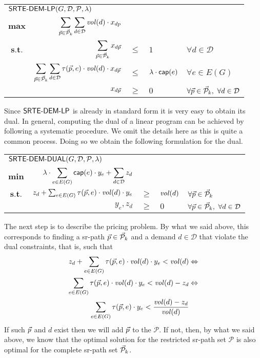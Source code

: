 \begin{center}
\begin{tabular}{crcll}
\multicolumn{5}{l}{$\displaystyle \textsf{SRTE-DEM-LP}(G, \mathcal{D}, \mathcal{P}, \lambda)$} \\[0.5cm] 
$\displaystyle \mathbf{max}$ & $\displaystyle \sum_{\vec{p} \in \mathcal{\vec{P}}_k} \sum_{d \in \mathcal{D}} \mathit{vol}(d) \cdot x_{dp}$ & & & \\[0.5cm]
$\textbf{s.t.}$ & $\displaystyle \sum_{\vec{p} \in \mathcal{\vec{P}}_k} x_{d \vec{p}}$ & $\leq$ & $1$ & $\forall d \in \mathcal{D}$ \\[0.5cm] 
& $\displaystyle \sum_{\vec{p} \in \mathcal{\vec{P}}_k} \sum_{d \in \mathcal{D}} \tau(\vec{p}, e)  \cdot \mathit{vol}(d) \cdot x_{d \vec{p}}$ & $\leq$ & $\lambda \cdot \mathsf{cap}(e)$ & $\forall e \in E(G)$ \\[0.5cm] 
& $x_{d\vec{p}}$ & $\geq$ & $0$ & $\forall \vec{p} \in \mathcal{\vec{P}}_k, \ \forall d \in \mathcal{D}$
\end{tabular}
\end{center}

Since $\textsf{SRTE-DEM-LP}$ is already in standard form it is very easy to obtain its dual. In general, computing the dual
of a linear program can be achieved by following a systematic procedure. We omit the details here as this is quite a common process.
Doing so we obtain the following formulation for the dual.

\begin{center}
\begin{tabular}{crcll}
\multicolumn{5}{l}{$\displaystyle \textsf{SRTE-DEM-DUAL}(G, \mathcal{D}, \mathcal{P}, \lambda)$} \\[0.5cm] 
$\displaystyle \mathbf{min}$ & $\displaystyle \lambda \cdot \sum_{e \in E(G)} \mathsf{cap}(e) \cdot y_e + \sum_{d \in \mathcal{D}} z_d$ & & & \\[0.5cm]
$\textbf{s.t.}$ & $z_d + \sum_{e \in E(G)} \tau(\vec{p}, e) \cdot \mathit{vol}(d) \cdot y_e$ & $\geq$ & $\mathit{vol}(d)$ & $\forall \vec{p} \in \mathcal{\vec{P}}_k$ \\[0.5cm] 
& $y_e, z_d$ & $\geq$ & $0$ & $\forall \vec{p} \in \mathcal{\vec{P}}_k, \ \forall d \in \mathcal{D}$
\end{tabular}
\end{center}

The next step is to describe the pricing problem. By what we said above, this  corresponds to finding a sr-path $\vec{p} \in \mathcal{\vec{P}}_k$ and a demand $d \in \mathcal{D}$
that violate the dual constraints, that is, such  that
\begin{align*}
z_d + \sum_{e \in E(G)} \tau(\vec{p}, e) \cdot \mathit{vol}(d) \cdot y_e < \mathit{vol}(d) & \Leftrightarrow \\
\sum_{e \in E(G)} \tau(\vec{p}, e) \cdot \mathit{vol}(d) \cdot y_e < \mathit{vol}(d) - z_d & \Leftrightarrow \\
\sum_{e \in E(G)} \tau(\vec{p}, e) \cdot y_e < \frac{\mathit{vol}(d) - z_d}{\mathit{vol}(d)} & \\
\end{align*}
If such $\vec{p}$ and $d$ exist then we will add $\vec{p}$ to the $\mathcal{P}$. If not, then, by what we said above, we know that the optimal solution for the restricted sr-path set $\mathcal{P}$
is also optimal for the complete sr-path set $\mathcal{\vec{P}}_k$.

